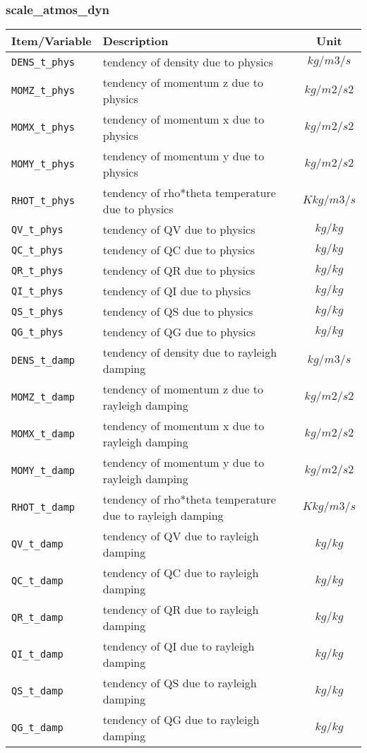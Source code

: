 \subsubsection{scale\_atmos\_dyn}
 \begin{tabularx}{150mm}{|l|X|c|} \hline
 \rowcolor[gray]{0.9} Item/Variable & Description  & Unit \\\hline
  \verb|DENS_t_phys| & tendency of density due to physics    & $kg/m3/s$  \\\hline
  \verb|MOMZ_t_phys| & tendency of momentum z due to physics & $kg/m2/s2$ \\\hline
  \verb|MOMX_t_phys| & tendency of momentum x due to physics & $kg/m2/s2$ \\\hline
  \verb|MOMY_t_phys| & tendency of momentum y due to physics & $kg/m2/s2$ \\\hline
  \verb|RHOT_t_phys| & tendency of rho*theta temperature due to physics & $K kg/m3/s$ \\\hline
  \verb|QV_t_phys|   & tendency of QV due to physics                    & $kg/kg$  \\\hline
  \verb|QC_t_phys|   & tendency of QC due to physics                    & $kg/kg$  \\\hline
  \verb|QR_t_phys|   & tendency of QR due to physics                    & $kg/kg$  \\\hline
  \verb|QI_t_phys|   & tendency of QI due to physics                    & $kg/kg$  \\\hline
  \verb|QS_t_phys|   & tendency of QS due to physics                    & $kg/kg$  \\\hline
  \verb|QG_t_phys|   & tendency of QG due to physics                    & $kg/kg$  \\\hline
  \verb|DENS_t_damp| & tendency of density due to rayleigh damping      & $kg/m3/s$ \\\hline
  \verb|MOMZ_t_damp| & tendency of momentum z due to rayleigh damping   & $kg/m2/s2$ \\\hline
  \verb|MOMX_t_damp| & tendency of momentum x due to rayleigh damping   & $kg/m2/s2$ \\\hline
  \verb|MOMY_t_damp| & tendency of momentum y due to rayleigh damping   & $kg/m2/s2$ \\\hline
  \verb|RHOT_t_damp| & tendency of rho*theta temperature due to rayleigh damping & $K kg/m3/s$ \\\hline
  \verb|QV_t_damp|   & tendency of QV due to rayleigh damping           & $kg/kg$  \\\hline
  \verb|QC_t_damp|   & tendency of QC due to rayleigh damping           & $kg/kg$  \\\hline
  \verb|QR_t_damp|   & tendency of QR due to rayleigh damping           & $kg/kg$  \\\hline
  \verb|QI_t_damp|   & tendency of QI due to rayleigh damping           & $kg/kg$  \\\hline
  \verb|QS_t_damp|   & tendency of QS due to rayleigh damping           & $kg/kg$  \\\hline
  \verb|QG_t_damp|   & tendency of QG due to rayleigh damping           & $kg/kg$  \\\hline
 \end{tabularx}

